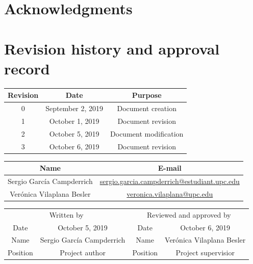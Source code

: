 \documentclass[a4paper,12pt,titlepage]{article}
\begin{document}
\section*{Acknowledgments}
\lipsum[1]
\thispagestyle{empty}

\section*{Revision history and approval record}
\begin{center}
\begin{tabular}{*3c}
\toprule
Revision & Date & Purpose \\
\midrule
0 & September 2, 2019 & Document creation \\
1 & October 1, 2019 & Document revision \\
2 & October 5, 2019 & Document modification \\
3 & October 6, 2019 & Document revision \\
\bottomrule
\end{tabular}
\end{center}

\begin{center}
\begin{tabular}{*2c}
\toprule
Name & E-mail \\
\midrule
Sergio García Campderrich & \url{sergio.garcia.campderrich@estudiant.upc.edu} \\
Verónica Vilaplana Besler & \url{veronica.vilaplana@upc.edu} \\
\bottomrule
\end{tabular}
\end{center}

\begin{center}
\begin{tabular}{*4c}
\toprule
\multicolumn{2}{c}{Written by} & \multicolumn{2}{c}{Reviewed and approved by}\\
Date & October 5, 2019 & Date & October 6, 2019 \\
\midrule
Name & Sergio García Campderrich & Name & Verónica Vilaplana Besler \\
Position & Project author & Position & Project supervisior \\
\bottomrule
\end{tabular}
\end{center}

\thispagestyle{empty}

\tableofcontents
\thispagestyle{empty}
\end{document}
